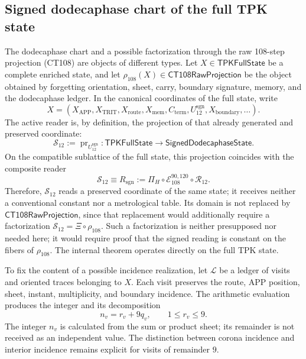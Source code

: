 \subsection{Signed dodecaphase chart of the full TPK state}
\label{subsec:registro-evaluacion-incidencial}

The dodecaphase chart and a possible factorization through the raw
108-step projection (CT108) are objects of different types. Let
\(X\in\mathsf{TPKFullState}\) be a complete enriched state, and let
\(\rho_{108}(X)\in\mathsf{CT108RawProjection}\) be the object obtained by
forgetting orientation, sheet, carry, boundary signature, memory, and the
dodecaphase ledger. In the canonical coordinates of the full state, write
\[
 X=(X_{\mathrm{APP}},X_{\mathrm{TRIT}},X_{\mathrm{route}},X_{\mathrm{mem}},
       C_{\mathrm{term}},U_{12}^{\mathrm{sgn}},
       X_{\mathrm{boundary}},\ldots).
\]
The active reader is, by definition, the projection of that already generated
and preserved coordinate:
\[
 \mathcal S_{12}:=\operatorname{pr}_{U_{12}^{\mathrm{sgn}}}:
 \mathsf{TPKFullState}\longrightarrow\mathsf{SignedDodecaphaseState}.
\]
On the compatible sublattice of the full state, this projection coincides
with the composite reader
\begin{equation}
 \mathcal S_{12}\equiv R_{\mathrm{sgn}}
 :=\Pi_H\circ\mathcal E_{108}^{90,120}\circ\mathcal R_{12}.
 \label{eq:registro-identidad-s12-rsgn}
\end{equation}
Therefore, \(\mathcal S_{12}\) reads a preserved coordinate of the same state;
it receives neither a conventional constant nor a metrological table. Its
domain is not replaced by \(\mathsf{CT108RawProjection}\), since that
replacement would additionally require a factorization
\(\mathcal S_{12}=\Xi\circ\rho_{108}\). Such a factorization is neither
presupposed nor needed here; it would require proof that the signed reading is
constant on the fibers of \(\rho_{108}\). The internal theorem operates
directly on the full TPK state.

To fix the content of a possible incidence realization, let \(\mathscr L\) be
a ledger of visits and oriented traces belonging to \(X\). Each visit
preserves the route, APP position, sheet, instant, multiplicity, and boundary
incidence. The arithmetic evaluation produces the integer and its
decomposition
\[
 n_v=r_v+9q_v,\qquad 1\leq r_v\leq9.
\]
The integer \(n_v\) is calculated from the sum or product sheet; its remainder
is not received as an independent value. The distinction between corona
incidence and interior incidence remains explicit for visits of remainder
\(9\).

